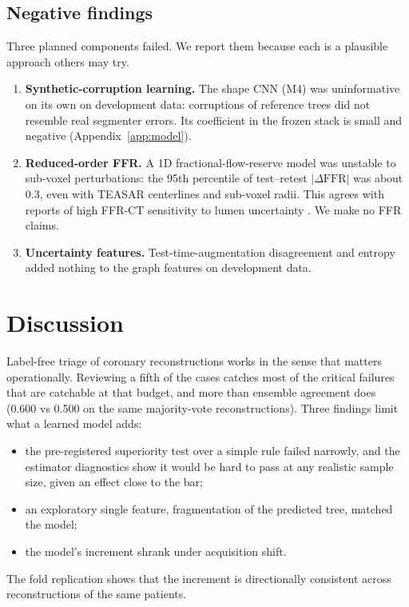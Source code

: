\documentclass[11pt]{article}
\begin{document}
\subsection{Negative findings}
Three planned components failed. We report them because each is a plausible approach others may try.
\begin{enumerate}
\item[(i)] \textbf{Synthetic-corruption learning.} The shape CNN (M4) was uninformative on its own on development data: corruptions of reference trees did not resemble real segmenter errors. Its coefficient in the frozen stack is small and negative (Appendix~\ref{app:model}).
\item[(ii)] \textbf{Reduced-order FFR.} A 1D fractional-flow-reserve model was unstable to sub-voxel perturbations: the 95th percentile of test--retest $|\Delta\mathrm{FFR}|$ was about 0.3, even with TEASAR centerlines and sub-voxel radii. This agrees with reports of high FFR-CT sensitivity to lumen uncertainty \citep{fernandez2024ffrct}. We make no FFR claims.
\item[(iii)] \textbf{Uncertainty features.} Test-time-augmentation disagreement and entropy added nothing to the graph features on development data.
\end{enumerate}

\section{Discussion}
Label-free triage of coronary reconstructions works in the sense that matters operationally. Reviewing a fifth of the cases catches most of the critical failures that are catchable at that budget, and more than ensemble agreement does (0.600 vs 0.500 on the same majority-vote reconstructions). Three findings limit what a learned model adds:
\begin{itemize}
\item the pre-registered superiority test over a simple rule failed narrowly, and the estimator diagnostics show it would be hard to pass at any realistic sample size, given an effect close to the bar;
\item an exploratory single feature, fragmentation of the predicted tree, matched the model;
\item the model's increment shrank under acquisition shift.
\end{itemize}
The fold replication shows that the increment is directionally consistent across reconstructions of the same patients.
\end{document}

